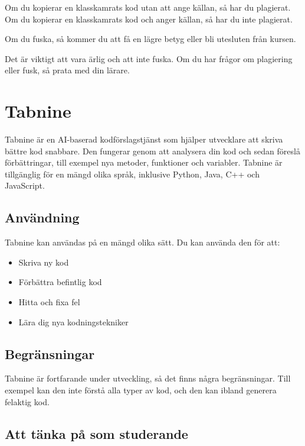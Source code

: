Om du kopierar en klasskamrats kod utan att ange källan, så har du
plagierat. Om du kopierar en klasskamrats kod och anger källan, så har
du inte plagierat.

Om du fuska, så kommer du att få en lägre betyg eller bli utesluten från
kursen.

Det är viktigt att vara ärlig och att inte fuska. Om du har frågor om
plagiering eller fusk, så prata med din lärare.

\hypertarget{tabnine}{%
\section{Tabnine}\label{tabnine}}

Tabnine är en AI-baserad kodförslagstjänst som hjälper utvecklare att
skriva bättre kod snabbare. Den fungerar genom att analysera din kod och
sedan föreslå förbättringar, till exempel nya metoder, funktioner och
variabler. Tabnine är tillgänglig för en mängd olika språk, inklusive
Python, Java, C++ och JavaScript.

\hypertarget{anvuxe4ndning}{%
\subsection{Användning}\label{anvuxe4ndning}}

Tabnine kan användas på en mängd olika sätt. Du kan använda den för att:

\begin{itemize}
\tightlist
\item
  Skriva ny kod
\item
  Förbättra befintlig kod
\item
  Hitta och fixa fel
\item
  Lära dig nya kodningstekniker
\end{itemize}

\hypertarget{begruxe4nsningar}{%
\subsection{Begränsningar}\label{begruxe4nsningar}}

Tabnine är fortfarande under utveckling, så det finns några
begränsningar. Till exempel kan den inte förstå alla typer av kod, och
den kan ibland generera felaktig kod.

\hypertarget{att-tuxe4nka-puxe5-som-studerande}{%
\subsection{Att tänka på som
studerande}\label{att-tuxe4nka-puxe5-som-studerande}}


